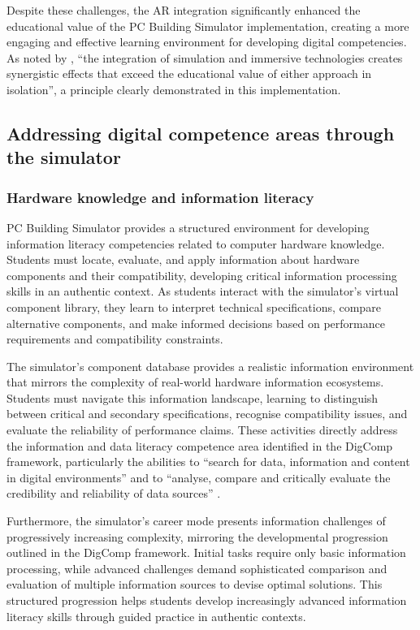 \documentclass[cte]{acnsart}
\begin{document}
Despite these challenges, the AR integration significantly enhanced the educational value of the PC Building Simulator implementation, creating a more engaging and effective learning environment for developing digital competencies. As noted by \citet{Kalua2020}, ``the integration of simulation and immersive technologies creates synergistic effects that exceed the educational value of either approach in isolation'', a principle clearly demonstrated in this implementation.

\subsection{Addressing digital competence areas through the simulator}

\subsubsection{Hardware knowledge and information literacy}

PC Building Simulator provides a structured environment for developing information literacy competencies related to computer hardware knowledge. Students must locate, evaluate, and apply information about hardware components and their compatibility, developing critical information processing skills in an authentic context. As students interact with the simulator's virtual component library, they learn to interpret technical specifications, compare alternative components, and make informed decisions based on performance requirements and compatibility constraints.

The simulator's component database provides a realistic information environment that mirrors the complexity of real-world hardware information ecosystems. Students must navigate this information landscape, learning to distinguish between critical and secondary specifications, recognise compatibility issues, and evaluate the reliability of performance claims. These activities directly address the information and data literacy competence area identified in the DigComp framework, particularly the abilities to ``search for data, information and content in digital environments'' and to ``analyse, compare and critically evaluate the credibility and reliability of data sources'' \cite{Vuorikari2016}.

Furthermore, the simulator's career mode presents information challenges of progressively increasing complexity, mirroring the developmental progression outlined in the DigComp framework. Initial tasks require only basic information processing, while advanced challenges demand sophisticated comparison and evaluation of multiple information sources to devise optimal solutions. This structured progression helps students develop increasingly advanced information literacy skills through guided practice in authentic contexts.
\end{document}
